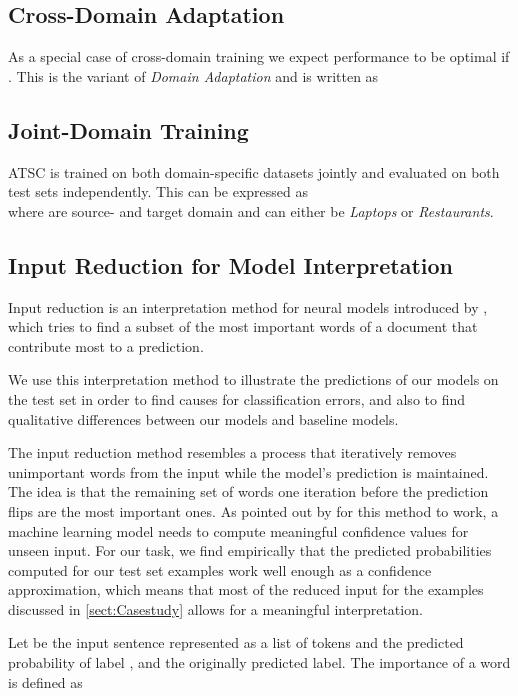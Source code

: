 \documentclass[11pt,a4paper]{article}
\begin{document}
\subsection*{Cross-Domain Adaptation}
As a special case of cross-domain training we expect performance to be optimal if . This is the variant of \textit{Domain Adaptation} and is written as \\
  
  
\subsection*{Joint-Domain Training} 
ATSC is trained on both domain-specific datasets jointly and evaluated on both test sets independently. This can be expressed as \\ where  are source- and target domain and can either be \textit{Laptops} or \textit{Restaurants}.

\subsection{Input Reduction for Model Interpretation}
\label{sect:Input-reduction}
Input reduction is an interpretation method for neural models introduced by \citet{Feng2018}, which tries to find a subset of the most important words of a document that contribute most to a prediction.

We use this interpretation method to illustrate the predictions of our models on the test set in order to find causes for classification errors, and also to find qualitative differences between our models and baseline models.

The input reduction method resembles a process that iteratively removes unimportant words from the input while the model's  prediction is maintained. The idea is that the remaining set of words one iteration before the prediction flips are the most important ones. 
As pointed out by \citet{Feng2018} for this method to work, a machine learning model needs to compute meaningful confidence values for unseen input. 
For our task, we find empirically that the predicted probabilities computed for our test set examples work well enough as a confidence approximation, which means that most of the reduced input for the examples discussed in  \autoref{sect:Casestudy} allows for a meaningful interpretation.

Let  be the input sentence represented as a list of tokens and  the predicted probability of label , and  the originally predicted label.
The importance of a word is defined as 
\end{document}
